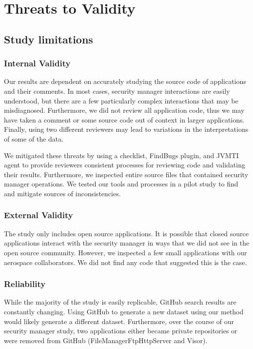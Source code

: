 \documentclass{sig-alternate}
\begin{document}
\section{Threats to Validity}

\subsection{Study limitations}\label{sub:Limitations-Study}
\subsubsection{Internal Validity}

Our results are dependent on accurately studying the source code of
applications and their comments. In most cases, security manager interactions
are easily understood, but there are a few particularly complex interactions
that may be misdiagnosed. Furthermore, we did not review all application
code, thus we may have taken a comment or some source code out of
context in larger applications. Finally, using two different reviewers
may lead to variations in the interpretations of some of the data. 

We mitigated these threats by using a checklist, FindBugs plugin, and JVMTI agent to
provide reviewers consistent processes for reviewing code
and validating their results. Furthermore,
we inspected entire source files that contained
security manager operations. We tested our tools and processes in a pilot study
to find and mitigate sources of inconsistencies.

\subsubsection{External Validity}

The study only includes open source applications. It is possible
that closed source applications interact with the security manager
in ways that we did not see in the open source community. However,
we inspected a few small applications with our aerospace collaborators.
We did not find any code that suggested this is the case. 

\subsubsection{Reliability}

While the majority of the study is easily replicable, GitHub search results are constantly
changing. Using GitHub to generate a new dataset using our method
would likely generate a different dataset. Furthermore, over the course of our security
manager study, two applications either became private repositories
or were removed from GitHub (FileManagerFtpHttpServer and Visor).
\end{document}

